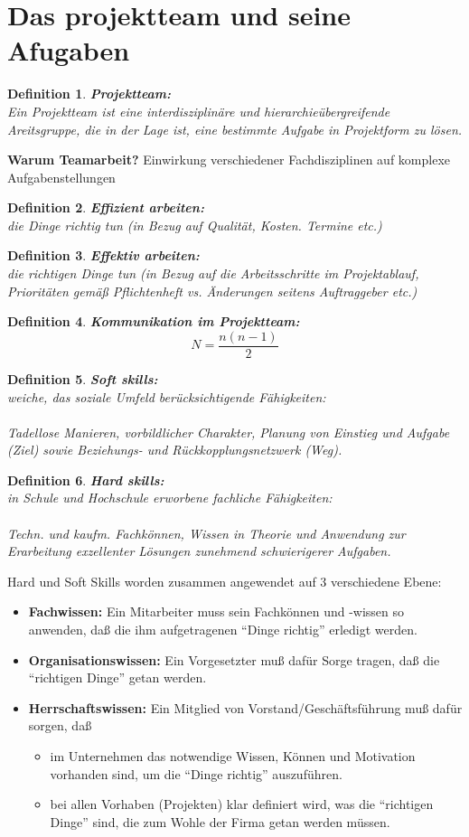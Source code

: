 \documentclass[11pt,a4paper]{article}
\newenvironment{de}[1]
{\begin{mdframed}[style=de]\begin{mydef}{\textbf{#1:}}\\} 
{\end{mydef}\end{mdframed}}
\newtheorem{mydef}{Definition}
\begin{document}
\section{Das projektteam und seine Afugaben}

\begin{de}{Projektteam}
Ein Projektteam ist eine interdisziplinäre und hierarchieübergreifende Areitsgruppe, die in der Lage ist, eine bestimmte Aufgabe in Projektform zu lösen.
\end{de}
\textbf{Warum Teamarbeit?} Einwirkung verschiedener Fachdisziplinen auf komplexe Aufgabenstellungen

\begin{de}{Effizient arbeiten}
die Dinge richtig tun
(in Bezug auf Qualität, Kosten. Termine etc.)
\end{de}

\begin{de}{Effektiv arbeiten}
die richtigen Dinge tun
(in Bezug auf die Arbeitsschritte im Projektablauf,
Prioritäten gemäß Pflichtenheft vs. Änderungen
seitens Auftraggeber etc.)
\end{de}

\begin{de}{Kommunikation im Projektteam}
$$
N = \frac{n(n-1)}{2}
$$
\end{de}

\begin{de}{Soft skills}
weiche, das soziale Umfeld berücksichtigende Fähigkeiten:\\
\\
Tadellose Manieren, vorbildlicher Charakter, Planung von Einstieg und
Aufgabe (Ziel) sowie Beziehungs- und Rückkopplungsnetzwerk (Weg).
\end{de}

\begin{de}{Hard skills}
in Schule und Hochschule erworbene fachliche Fähigkeiten:\\
\\
Techn. und kaufm. Fachkönnen, Wissen in Theorie und Anwendung zur
Erarbeitung exzellenter Lösungen zunehmend schwierigerer Aufgaben.
\end{de}
\noindent
Hard und Soft Skills worden zusammen angewendet auf 3 verschiedene Ebene:
\begin{itemize}
\item \textbf{Fachwissen:} Ein Mitarbeiter muss sein Fachkönnen und -wissen so
anwenden, daß die ihm aufgetragenen ``Dinge richtig'' erledigt werden.
\item \textbf{Organisationswissen:} Ein Vorgesetzter muß dafür Sorge tragen, daß die
``richtigen Dinge'' getan werden.
\item \textbf{Herrschaftswissen:} Ein Mitglied von Vorstand/Geschäftsführung muß
dafür sorgen, daß
\begin{itemize}
	\item im Unternehmen das notwendige Wissen, Können und Motivation
vorhanden sind, um die ``Dinge richtig'' auszuführen.
	\item bei allen Vorhaben (Projekten) klar definiert wird, was die ``richtigen
Dinge'' sind, die zum Wohle der Firma getan werden müssen.
\end{itemize}
\end{itemize}
\end{document}
